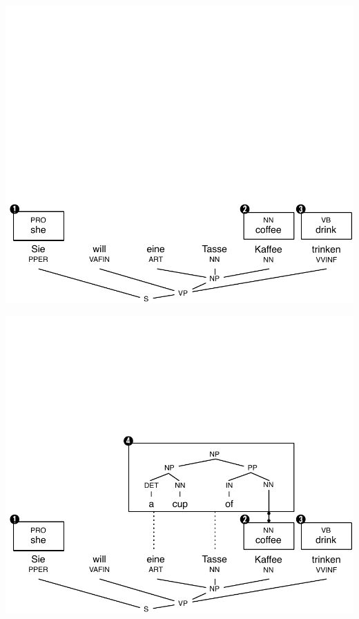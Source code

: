 \documentclass[landscape]{uedslides2C}
\begin{document}

\vspace{-31mm}
\begin{center}
\includegraphics[scale=1.15]{chart-parsing3.pdf}
\end{center}


\vspace{-31mm}
\begin{center}
\includegraphics[scale=1.15]{chart-parsing4.pdf}
\end{center}
\end{document}
